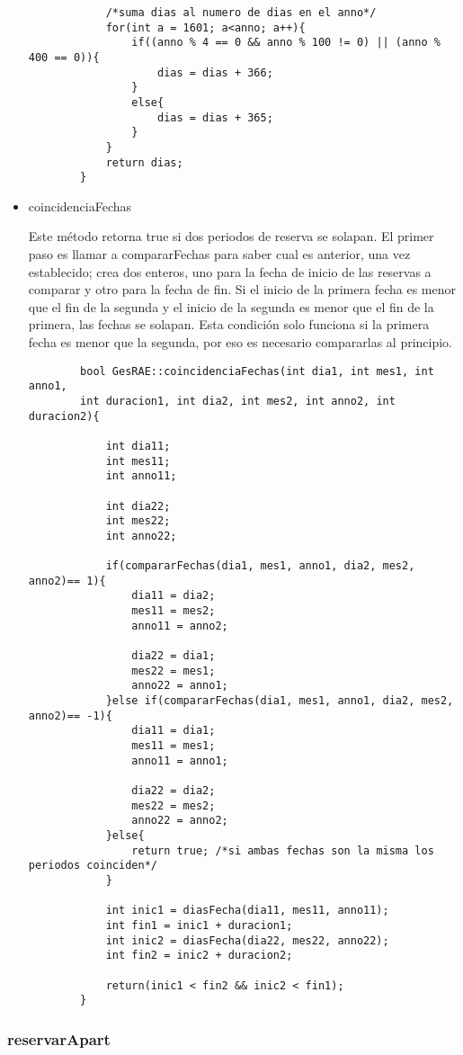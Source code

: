 \documentclass[12pt]{article}
\begin{document}
\begin{itemize}
\begin{lstlisting}
			/*suma dias al numero de dias en el anno*/
			for(int a = 1601; a<anno; a++){
				if((anno % 4 == 0 && anno % 100 != 0) || (anno % 400 == 0)){
					dias = dias + 366;
				}
				else{
					dias = dias + 365;
				}
			}
			return dias;
		}
	\end{lstlisting}
	
	\item coincidenciaFechas
	
	Este método retorna true si dos periodos de reserva se solapan. 
	El primer paso es llamar a compararFechas para saber cual es anterior, una vez establecido; crea dos enteros, uno para la fecha de inicio de las reservas a comparar y otro para la fecha de fin. Si el inicio de la primera fecha es menor que el fin de la segunda y el inicio de la segunda es menor que el fin de la primera, las fechas se solapan.  Esta condición solo funciona si la primera fecha es menor que la segunda, por eso es necesario compararlas al principio.
	\begin{lstlisting}
		bool GesRAE::coincidenciaFechas(int dia1, int mes1, int anno1,
		int duracion1, int dia2, int mes2, int anno2, int duracion2){
			
			int dia11;
			int mes11;
			int anno11;
			
			int dia22;
			int mes22;
			int anno22;
			
			if(compararFechas(dia1, mes1, anno1, dia2, mes2, anno2)== 1){
				dia11 = dia2;
				mes11 = mes2;
				anno11 = anno2;
				
				dia22 = dia1;
				mes22 = mes1;
				anno22 = anno1;
			}else if(compararFechas(dia1, mes1, anno1, dia2, mes2, anno2)== -1){
				dia11 = dia1;
				mes11 = mes1;
				anno11 = anno1;
				
				dia22 = dia2;
				mes22 = mes2;
				anno22 = anno2;
			}else{
				return true; /*si ambas fechas son la misma los periodos coinciden*/
			}
			
			int inic1 = diasFecha(dia11, mes11, anno11);
			int fin1 = inic1 + duracion1;
			int inic2 = diasFecha(dia22, mes22, anno22);
			int fin2 = inic2 + duracion2;
			
			return(inic1 < fin2 && inic2 < fin1);
		}
	\end{lstlisting}
	
	\end{itemize}
	\subsubsection{reservarApart}
	
\end{document}
